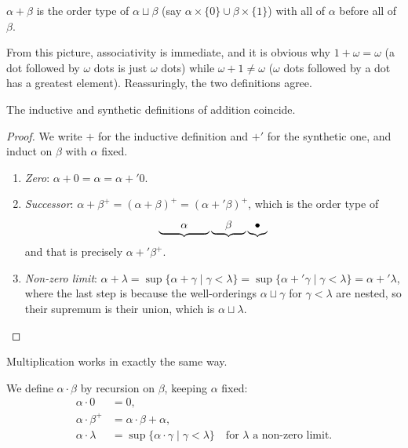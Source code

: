 \documentclass[a4paper]{scrartcl}
\begin{document}
\begin{definition}
  $\alpha + \beta$ is the order type of $\alpha \sqcup \beta$ (say $\alpha \times \{0\} \cup \beta \times \{1\}$) with all of $\alpha$ before all of $\beta$.
\end{definition}

From this picture, associativity is immediate, and it is obvious why $1 + \omega = \omega$ (a dot followed by $\omega$ dots is just $\omega$ dots) while $\omega + 1 \neq \omega$ ($\omega$ dots followed by a dot has a greatest element). Reassuringly, the two definitions agree.

\begin{proposition}
  The inductive and synthetic definitions of addition coincide.
\end{proposition}
\begin{proof}
We write $+$ for the inductive definition and $+'$ for the synthetic one, and induct on $\beta$ with $\alpha$ fixed.
\begin{enumerate}[label=(\roman*)]
  \item \emph{Zero}: $\alpha + 0 = \alpha = \alpha +' 0$.
  \item \emph{Successor}: $\alpha + \beta^+ = (\alpha + \beta)^+ = (\alpha +' \beta)^+$, which is the order type of
  $$
  \underbrace{\quad\quad\vphantom{\beta}\alpha\vphantom{\beta}\quad\quad}\underbrace{\quad\;\beta\;\quad}
  \underbrace{\vphantom{\beta}\bullet\vphantom{\beta}}
  $$
  and that is precisely $\alpha +' \beta^+$.
  \item \emph{Non-zero limit}: $\alpha + \lambda = \sup\{\alpha + \gamma \mid \gamma < \lambda\} = \sup\{\alpha +' \gamma \mid \gamma < \lambda\} = \alpha +' \lambda$, where the last step is because the well-orderings $\alpha \sqcup \gamma$ for $\gamma < \lambda$ are nested, so their supremum is their union, which is $\alpha \sqcup \lambda$. \qedhere
\end{enumerate}
\end{proof}

Multiplication works in exactly the same way.

\begin{definition}
  We define $\alpha \cdot \beta$ by recursion on $\beta$, keeping $\alpha$ fixed:
  \begin{align*}
    \alpha \cdot 0 &= 0, \\
    \alpha \cdot \beta^+ &= \alpha \cdot \beta + \alpha, \\
    \alpha \cdot \lambda &= \sup \{\alpha \cdot \gamma \mid \gamma < \lambda\} \quad \text{for } \lambda \text{ a non-zero limit.}
  \end{align*}
\end{definition}
\end{document}
